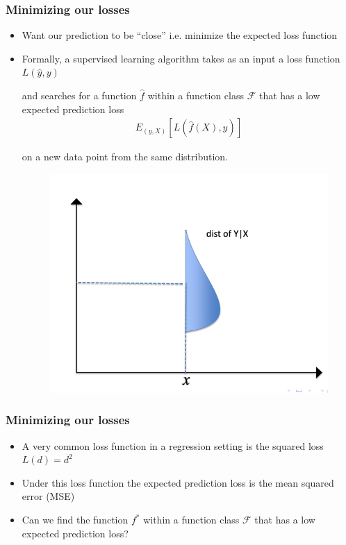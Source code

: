\documentclass[
  shownotes,
  xcolor={svgnames},
  hyperref={colorlinks,citecolor=DarkBlue,linkcolor=andesred,urlcolor=DarkBlue}
  , aspectratio=169]{beamer}
\begin{document}
\begin{frame}
\frametitle{Minimizing our losses}

\begin{itemize}
\item Want our prediction to be ``close'' i.e. minimize the expected loss function
\medskip
\item Formally, a supervised learning algorithm takes as an input a loss function  $L(\hat{y},y)$
\medskip

and searches for a function $\hat{f}$ within a function class ${\mathcal{F}}$ that has a low expected prediction loss 
\begin{align}
E_{(y,X)}[L(\hat{f}(X),y)] 
\end{align}

on a new data point from the same distribution.

  \begin{figure}[H] \centering
            \captionsetup{justification=centering}  
            \includegraphics[scale=0.4]{figures/cond_distrib1.png}
            
    \end{figure}

\end{itemize}


\end{frame}
\begin{frame}
\frametitle{Minimizing our losses}


\begin{itemize}
\item A very common loss function in a regression setting is the squared loss $L(d)=d^2$
\medskip
\item Under this loss function the expected prediction loss  is the mean squared error (MSE)
\medskip
\item Can we find the function $f^*$ within a function class ${\mathcal{F}}$ that has a low expected prediction loss?

\end{itemize}


\end{frame}
\end{document}
